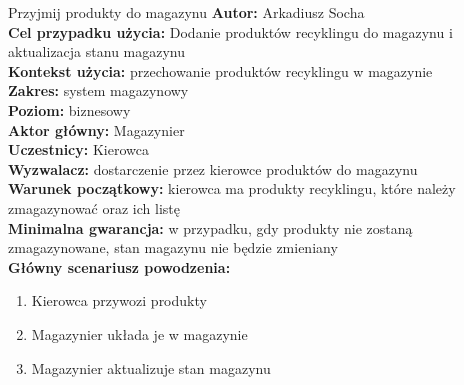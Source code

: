 \begin{usecase}{Przyjmij produkty do magazynu}
	\textbf{Autor:} Arkadiusz Socha\\
	\textbf{Cel przypadku użycia:} Dodanie produktów recyklingu do magazynu i aktualizacja stanu magazynu \\
	\textbf{Kontekst użycia:} przechowanie produktów recyklingu w magazynie\\
	\textbf{Zakres:} system magazynowy \\
	\textbf{Poziom:} biznesowy \\
	\textbf{Aktor główny:} Magazynier \\
	\textbf{Uczestnicy:} Kierowca \\
	\textbf{Wyzwalacz:} dostarczenie przez kierowce produktów do magazynu \\
	\textbf{Warunek początkowy:} kierowca ma produkty recyklingu, które należy zmagazynować oraz ich listę \\
	\textbf{Minimalna gwarancja:} w przypadku, gdy produkty nie zostaną zmagazynowane, stan magazynu nie będzie zmieniany \\
	\textbf{Główny scenariusz powodzenia:} \\
		\begin{enumerate}
			\item Kierowca przywozi produkty
			\item Magazynier układa je w magazynie
			\item Magazynier aktualizuje stan magazynu
		\end{enumerate}
\end{usecase}


